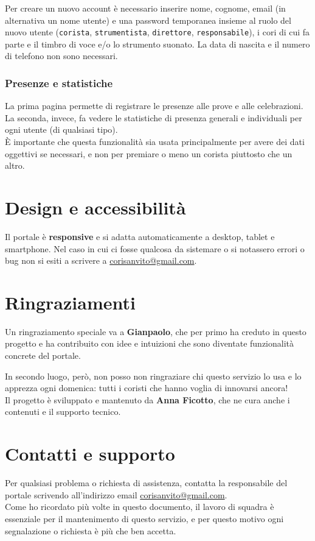 \documentclass[a4paper,12pt]{article}
\newcommand{\roledirettore}{\texttt{direttore}}
\newcommand{\roleresponsabile}{\texttt{responsabile}}
\newcommand{\rolecorista}{\texttt{corista}}
\newcommand{\rolestrumentista}{\texttt{strumentista}}
\begin{document}
	Per creare un nuovo account è necessario inserire nome, cognome, email (in alternativa un nome utente) e una password temporanea insieme al ruolo del nuovo utente (\rolecorista, \rolestrumentista, \roledirettore, \roleresponsabile), i cori di cui fa parte e il timbro di voce e/o lo strumento suonato. La data di nascita e il numero di telefono non sono necessari.
	
	\subsubsection{Presenze e statistiche}
	La prima pagina permette di registrare le presenze alle prove e alle celebrazioni. La seconda, invece, fa vedere le statistiche di presenza generali e individuali per ogni utente (di qualsiasi tipo).\\
	È importante che questa funzionalità sia usata principalmente per avere dei dati oggettivi se necessari, e non per premiare o meno un corista piuttosto che un altro.
	
	
	
	
	\section{Design e accessibilità}
	Il portale è \textbf{responsive} e si adatta automaticamente a desktop, tablet e smartphone. Nel caso in cui ci fosse qualcosa da sistemare o si notassero errori o bug non si esiti a scrivere a \href{mailto:corisanvito@gmail.com}{corisanvito@gmail.com}.
	
	
	\section{Ringraziamenti}	
	Un ringraziamento speciale va a \textbf{Gianpaolo}, che per primo ha creduto in questo progetto e ha contribuito con idee e intuizioni che sono diventate funzionalità concrete del portale.
	
	In secondo luogo, però, non posso non ringraziare chi questo servizio lo usa e lo apprezza ogni domenica: tutti i coristi che hanno voglia di innovarsi ancora!\\
	
	Il progetto è sviluppato e mantenuto da \textbf{Anna Ficotto}, che ne cura anche i contenuti e il supporto tecnico.
	
	
	\section{Contatti e supporto}
	Per qualsiasi problema o richiesta di assistenza, contatta la responsabile del portale scrivendo all'indirizzo email \href{mailto:corisanvito@gmail.com}{corisanvito@gmail.com}.\\
	
	Come ho ricordato più volte in questo documento, il lavoro di squadra è essenziale per il mantenimento di questo servizio, e per questo motivo ogni segnalazione o richiesta è più che ben accetta.
	
\end{document}
